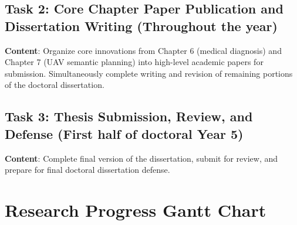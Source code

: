 \subsection{Task 2: Core Chapter Paper Publication and Dissertation Writing (Throughout the year)}

\textbf{Content}: Organize core innovations from Chapter 6 (medical diagnosis) and Chapter 7 (UAV semantic planning) into high-level academic papers for submission. Simultaneously complete writing and revision of remaining portions of the doctoral dissertation.

\subsection{Task 3: Thesis Submission, Review, and Defense (First half of doctoral Year 5)}

\textbf{Content}: Complete final version of the dissertation, submit for review, and prepare for final doctoral dissertation defense.

\section{Research Progress Gantt Chart}

